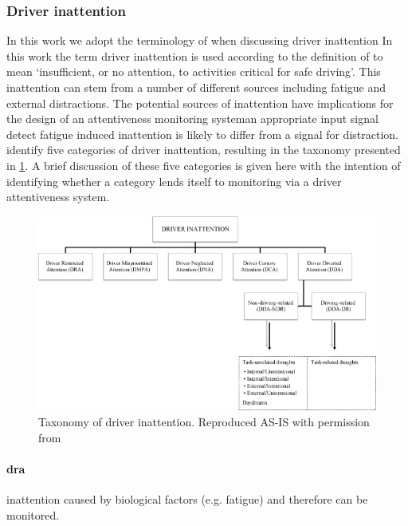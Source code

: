 \documentclass[11pt, parskip=half*,twoside=false]{scrbook}
\begin{document}
\subsubsection{Driver inattention}
In this work we adopt the terminology of \citet{reganDriverDistractionDriver2011} when discussing driver inattention
In this work the term driver inattention is used according to the definition of \citet{reganDriverDistractionDriver2011} to mean `insufficient, or no attention, to activities critical for safe driving'. This inattention can stem from a number of different sources including fatigue and external distractions. The potential sources of inattention have implications for the design of an attentiveness monitoring system\textemdash an appropriate input signal detect fatigue induced inattention is likely to differ from a signal for distraction.  \citet{reganDriverDistractionDriver2011} identify five categories of driver inattention, resulting in the taxonomy presented in \cref{fig:taxonomy_inattention}. A brief discussion of these five categories is given here with the intention of identifying whether a category lends itself to monitoring via a driver attentiveness system. 

\begin{figure} 
	\centering
	\includegraphics[width=\textwidth]{driver_inattention_taxonomy} 
	\caption{Taxonomy of driver inattention. Reproduced AS-IS with permission from \citep{reganDriverDistractionDriver2011}}
	\label{fig:taxonomy_inattention}
\end{figure}


\paragraph{\gls{dra}} inattention caused by biological factors (e.g. fatigue) and therefore can be monitored.
\end{document}
